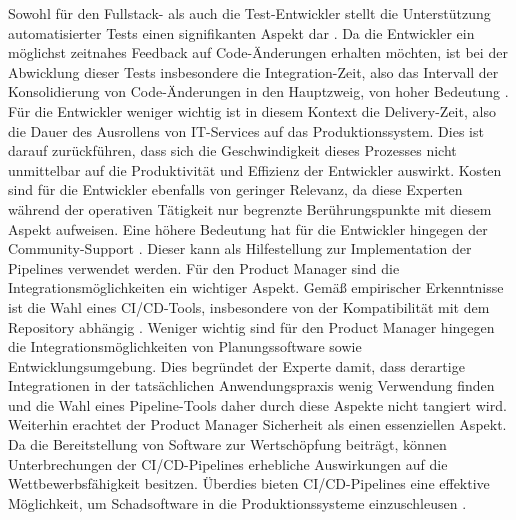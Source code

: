 \vspace*{-15mm}
Sowohl für den Fullstack- als auch die Test-Entwickler stellt die Unterstützung automatisierter Tests einen signifikanten Aspekt dar \cite[Z. 5 ff.]{BackendTestDeveloperSAPDTSIntegration.}. Da die Entwickler ein möglichst zeitnahes Feedback auf Code-Änderungen erhalten möchten, ist bei der Abwicklung dieser Tests insbesondere die Integration-Zeit, also das Intervall der Konsolidierung von Code-Änderungen in den Hauptzweig, von hoher Bedeutung \cite[Z. 23 ff.]{TestDeveloperSAPHyperspaceAdoption&Onboarding.b}. Für die Entwickler weniger wichtig ist in diesem Kontext die Delivery-Zeit, also die Dauer des Ausrollens von IT-Services auf das Produktionssystem. Dies ist darauf zurückführen, dass sich die Geschwindigkeit dieses Prozesses nicht unmittelbar auf die Produktivität und Effizienz der Entwickler auswirkt. Kosten sind für die Entwickler ebenfalls von geringer Relevanz, da diese Experten während der operativen Tätigkeit nur begrenzte Berührungspunkte mit diesem Aspekt aufweisen. Eine höhere Bedeutung hat für die Entwickler hingegen der Community-Support \cite[Z. 25 ff.]{FullStackEntwicklerSAPDTSIntegration.}. Dieser kann als Hilfestellung zur Implementation der Pipelines verwendet werden. Für den Product Manager sind die Integrationsmöglichkeiten ein wichtiger Aspekt. Gemäß empirischer Erkenntnisse ist die Wahl eines CI/CD-Tools, insbesondere von der Kompatibilität mit dem Repository abhängig \cite[Z. 5 ff.]{exp8}. Weniger wichtig sind für den Product Manager hingegen die Integrationsmöglichkeiten von Planungssoftware sowie Entwicklungsumgebung. Dies begründet der Experte damit, dass derartige Integrationen in der tatsächlichen Anwendungspraxis wenig Verwendung finden und die Wahl eines Pipeline-Tools daher durch diese Aspekte nicht tangiert wird. Weiterhin erachtet der Product Manager Sicherheit als einen essenziellen Aspekt. Da die Bereitstellung von Software zur Wertschöpfung beiträgt, können Unterbrechungen der CI/CD-Pipelines erhebliche Auswirkungen auf die Wettbewerbsfähigkeit besitzen. Überdies bieten CI/CD-Pipelines eine effektive Möglichkeit, um Schadsoftware in die Produktionssysteme einzuschleusen \cite[Z. 5 ff.]{exp8}. 

